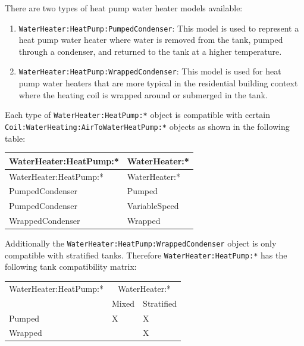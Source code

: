 There are two types of heat pump water heater models available:

\begin{enumerate}
\def\labelenumi{\arabic{enumi}.}
\tightlist
\item
  \lstinline!WaterHeater:HeatPump:PumpedCondenser!: This model is used to represent a heat pump water heater where water is removed from the tank, pumped through a condenser, and returned to the tank at a higher temperature.
\item
  \lstinline!WaterHeater:HeatPump:WrappedCondenser!: This model is used for heat pump water heaters that are more typical in the residential building context where the heating coil is wrapped around or submerged in the tank.
\end{enumerate}

Each type of \lstinline!WaterHeater:HeatPump:*! object is compatible with certain \lstinline!Coil:WaterHeating:AirToWaterHeatPump:*! objects as shown in the following table:

\begin{longtable}[c]{@{}ll@{}}
\toprule 
WaterHeater:HeatPump:* & WaterHeater:* \tabularnewline
\midrule
\endfirsthead

\toprule 
WaterHeater:HeatPump:* & WaterHeater:* \tabularnewline
\midrule
\endhead

PumpedCondenser & Pumped \tabularnewline
PumpedCondenser & VariableSpeed \tabularnewline
WrappedCondenser & Wrapped \tabularnewline
\bottomrule
\end{longtable}

Additionally the \lstinline!WaterHeater:HeatPump:WrappedCondenser! object is only compatible with stratified tanks. Therefore \lstinline!WaterHeater:HeatPump:*! has the following tank compatibility matrix:

\begin{longtable}[c]{@{}lll@{}}
\toprule
WaterHeater:HeatPump:* & \multicolumn{2}{c}{WaterHeater:*} \tabularnewline
\cmidrule{2-3}
& Mixed & Stratified \tabularnewline
\midrule
\endhead

Pumped & X & X \tabularnewline
Wrapped &  & X \tabularnewline
\bottomrule
\end{longtable}

